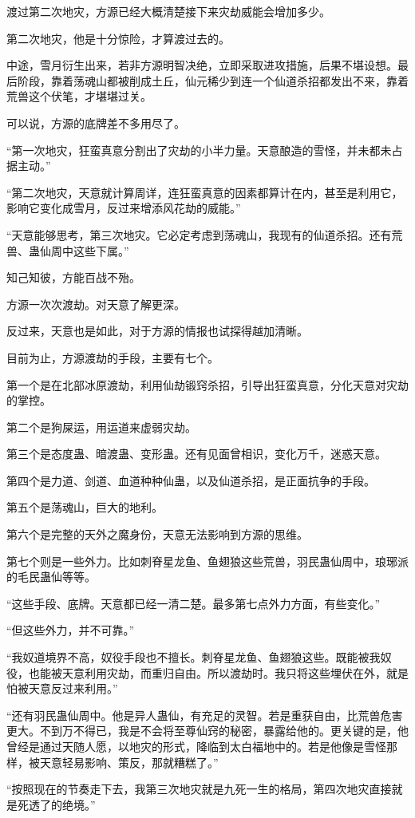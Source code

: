 \begin{this_body}
渡过第二次地灾，方源已经大概清楚接下来灾劫威能会增加多少。

第二次地灾，他是十分惊险，才算渡过去的。

中途，雪月衍生出来，若非方源明智决绝，立即采取进攻措施，后果不堪设想。最后阶段，靠着荡魂山都被削成土丘，仙元稀少到连一个仙道杀招都发出不来，靠着荒兽这个伏笔，才堪堪过关。

可以说，方源的底牌差不多用尽了。

“第一次地灾，狂蛮真意分割出了灾劫的小半力量。天意酿造的雪怪，并未都未占据主动。”

“第二次地灾，天意就计算周详，连狂蛮真意的因素都算计在内，甚至是利用它，影响它变化成雪月，反过来增添风花劫的威能。”

“天意能够思考，第三次地灾。它必定考虑到荡魂山，我现有的仙道杀招。还有荒兽、蛊仙周中这些下属。”

知己知彼，方能百战不殆。

方源一次次渡劫。对天意了解更深。

反过来，天意也是如此，对于方源的情报也试探得越加清晰。

目前为止，方源渡劫的手段，主要有七个。

第一个是在北部冰原渡劫，利用仙劫锻窍杀招，引导出狂蛮真意，分化天意对灾劫的掌控。

第二个是狗屎运，用运道来虚弱灾劫。

第三个是态度蛊、暗渡蛊、变形蛊。还有见面曾相识，变化万千，迷惑天意。

第四个是力道、剑道、血道种种仙蛊，以及仙道杀招，是正面抗争的手段。

第五个是荡魂山，巨大的地利。

第六个是完整的天外之魔身份，天意无法影响到方源的思维。

第七个则是一些外力。比如刺脊星龙鱼、鱼翅狼这些荒兽，羽民蛊仙周中，琅琊派的毛民蛊仙等等。

“这些手段、底牌。天意都已经一清二楚。最多第七点外力方面，有些变化。”

“但这些外力，并不可靠。”

“我奴道境界不高，奴役手段也不擅长。刺脊星龙鱼、鱼翅狼这些。既能被我奴役，也能被天意利用灾劫，而重归自由。所以渡劫时。我只将这些埋伏在外，就是怕被天意反过来利用。”

“还有羽民蛊仙周中。他是异人蛊仙，有充足的灵智。若是重获自由，比荒兽危害更大。不到万不得已，我是不会将至尊仙窍的秘密，暴露给他的。更关键的是，他曾经是通过天随人愿，以地灾的形式，降临到太白福地中的。若是他像是雪怪那样，被天意轻易影响、策反，那就糟糕了。”

“按照现在的节奏走下去，我第三次地灾就是九死一生的格局，第四次地灾直接就是死透了的绝境。”


\end{this_body}
